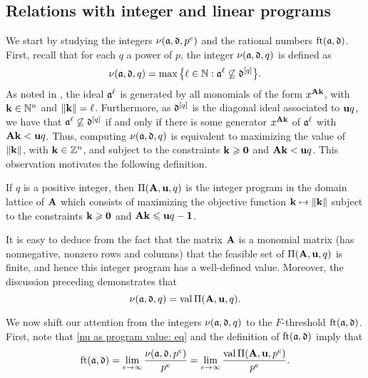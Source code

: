 \documentclass{article}
\begin{document}
\subsection{Relations with integer and linear programs}
We start by studying the integers $\nu(\mathfrak{a}, \mathfrak{d}, p^e)$ and the rational numbers $\operatorname{ft}(\mathfrak{a}, \mathfrak{d})$.
First, recall that for each $q$ a power of $p$, the integer $\nu(\mathfrak{a}, \mathfrak{d}, q)$ is defined as
\[\nu(\mathfrak{a},\mathfrak{d},q) = \max\big\{\ell \in \mathbb{N} : \mathfrak{a}^{\ell} \not\subseteq \mathfrak{d}^{[q]}\big\}.\]
As noted in ,  the ideal $\mathfrak{a}^{\ell}$ is generated by all monomials of the form $x^{\mathbf{A}\mathbf{k}}$, with $\mathbf{k}\in \mathbb{N}^n$ and $\| \mathbf{k} \| = \ell$.  Furthermore, as $\mathfrak{d}^{[q]}$ is the diagonal ideal associated to $\mathbf{u}q$, we have that $\mathfrak{a}^{\ell} \not\subseteq \mathfrak{d}^{[q]}$ if and only if there is some generator $x^{\mathbf{A} \mathbf{k}}$ of $\mathfrak{a}^{\ell}$ with $\mathbf{A}\mathbf{k} < \mathbf{u}q$.  Thus, computing $\nu(\mathfrak{a},\mathfrak{d},q)$ is equivalent to maximizing the value of $\| \mathbf{k} \|$, with $\mathbf{k} \in \mathbb{Z}^n$, and subject to the constraints $\mathbf{k} \geqslant \mathbf{0}$ and $\mathbf{A}\mathbf{k} < \mathbf{u}q$.
This observation motivates the following definition.

\begin{definition}
\label{IP: D}
   If $q$ is a positive integer, then $\Pi(\mathbf{A}, \mathbf{u}, q)$ is the integer program in the domain lattice of $\mathbf{A}$ which consists of maximizing the objective function $\mathbf{k} \mapsto \| \mathbf{k} \|$ subject to the constraints $\mathbf{k} \geqslant \mathbf{0}$ and $\mathbf{A} \mathbf{k} \leqslant \mathbf{u}q - \mathbf{1}$.
\end{definition}

It is easy to deduce from the fact that the matrix $\mathbf{A}$ is a monomial matrix (\ie has nonnegative, nonzero rows and columns) that the feasible set of $\Pi(\mathbf{A},\mathbf{u},q)$ is finite, and hence this integer program has a well-defined value.
Moreover, the discussion preceding  demonstrates that
\begin{equation}
\label{nu as program value: eq}
\nu(\mathfrak{a},\mathfrak{d},q) = \operatorname{val} \Pi(\mathbf{A},\mathbf{u},q).
\end{equation}

We now shift our attention from the integers $\nu(\mathfrak{a}, \mathfrak{d}, q)$ to the $F$-threshold $\operatorname{ft}(\mathfrak{a}, \mathfrak{d})$.  First, note that \eqref{nu as program value: eq} and the definition of $\operatorname{ft}(\mathfrak{a}, \mathfrak{d})$ imply that
\begin{equation}
\label{ft as limit of normalized program values: eq}
\operatorname{ft}(\mathfrak{a}, \mathfrak{d}) = \lim_{e\to\infty} \frac{\nu(\mathfrak{a},\mathfrak{d},p^e)}{p^e} = \lim_{e\to\infty} \frac{\operatorname{val} \Pi(\mathbf{A},\mathbf{u},p^e)}{p^e}.
\end{equation}
\end{document}
